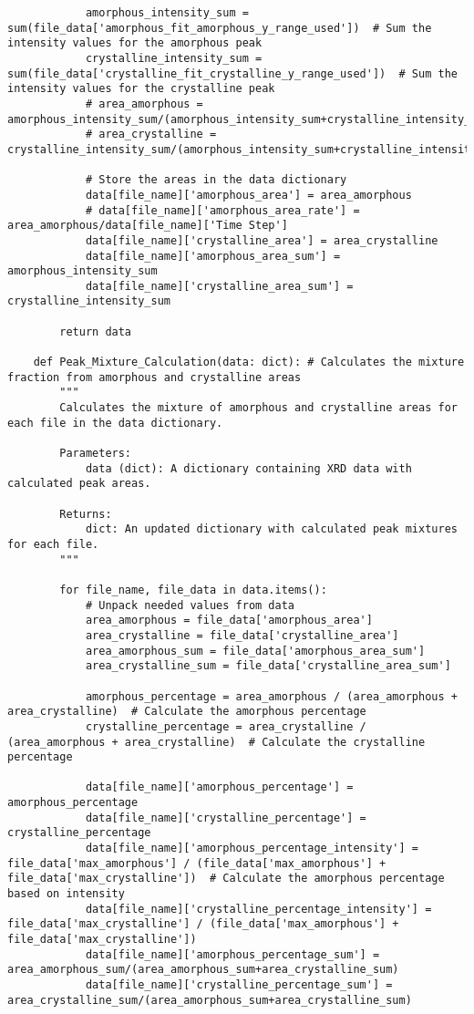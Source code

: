 \begin{lstlisting}
            amorphous_intensity_sum = sum(file_data['amorphous_fit_amorphous_y_range_used'])  # Sum the intensity values for the amorphous peak
            crystalline_intensity_sum = sum(file_data['crystalline_fit_crystalline_y_range_used'])  # Sum the intensity values for the crystalline peak
            # area_amorphous = amorphous_intensity_sum/(amorphous_intensity_sum+crystalline_intensity_sum)
            # area_crystalline = crystalline_intensity_sum/(amorphous_intensity_sum+crystalline_intensity_sum)

            # Store the areas in the data dictionary
            data[file_name]['amorphous_area'] = area_amorphous
            # data[file_name]['amorphous_area_rate'] = area_amorphous/data[file_name]['Time Step']
            data[file_name]['crystalline_area'] = area_crystalline
            data[file_name]['amorphous_area_sum'] = amorphous_intensity_sum
            data[file_name]['crystalline_area_sum'] = crystalline_intensity_sum

        return data

    def Peak_Mixture_Calculation(data: dict): # Calculates the mixture fraction from amorphous and crystalline areas
        """
        Calculates the mixture of amorphous and crystalline areas for each file in the data dictionary.

        Parameters:
            data (dict): A dictionary containing XRD data with calculated peak areas.

        Returns:
            dict: An updated dictionary with calculated peak mixtures for each file.
        """

        for file_name, file_data in data.items():
            # Unpack needed values from data
            area_amorphous = file_data['amorphous_area']
            area_crystalline = file_data['crystalline_area']
            area_amorphous_sum = file_data['amorphous_area_sum']
            area_crystalline_sum = file_data['crystalline_area_sum']

            amorphous_percentage = area_amorphous / (area_amorphous + area_crystalline)  # Calculate the amorphous percentage
            crystalline_percentage = area_crystalline / (area_amorphous + area_crystalline)  # Calculate the crystalline percentage

            data[file_name]['amorphous_percentage'] = amorphous_percentage
            data[file_name]['crystalline_percentage'] = crystalline_percentage
            data[file_name]['amorphous_percentage_intensity'] = file_data['max_amorphous'] / (file_data['max_amorphous'] + file_data['max_crystalline'])  # Calculate the amorphous percentage based on intensity
            data[file_name]['crystalline_percentage_intensity'] = file_data['max_crystalline'] / (file_data['max_amorphous'] + file_data['max_crystalline'])
            data[file_name]['amorphous_percentage_sum'] = area_amorphous_sum/(area_amorphous_sum+area_crystalline_sum)
            data[file_name]['crystalline_percentage_sum'] = area_crystalline_sum/(area_amorphous_sum+area_crystalline_sum)


\end{lstlisting}
